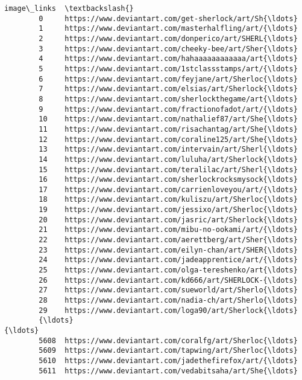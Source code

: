 \documentclass[11pt]{article}
\begin{document}
\begin{Verbatim}[commandchars=\\\{\}]
                                                    image\_links  \textbackslash{}
        0     https://www.deviantart.com/get-sherlock/art/Sh{\ldots}   
        1     https://www.deviantart.com/masterhalfling/art/{\ldots}   
        2     https://www.deviantart.com/donperico/art/SHERL{\ldots}   
        3     https://www.deviantart.com/cheeky-bee/art/Sher{\ldots}   
        4     https://www.deviantart.com/hahaaaaaaaaaaaa/art{\ldots}   
        5     https://www.deviantart.com/1stclassstamps/art/{\ldots}   
        6     https://www.deviantart.com/feyjane/art/Sherloc{\ldots}   
        7     https://www.deviantart.com/elsias/art/Sherlock{\ldots}   
        8     https://www.deviantart.com/sherlockthegame/art{\ldots}   
        9     https://www.deviantart.com/fractionofadot/art/{\ldots}   
        10    https://www.deviantart.com/nathalief87/art/She{\ldots}   
        11    https://www.deviantart.com/risachantag/art/She{\ldots}   
        12    https://www.deviantart.com/coraline125/art/She{\ldots}   
        13    https://www.deviantart.com/intervain/art/Sherl{\ldots}   
        14    https://www.deviantart.com/luluha/art/Sherlock{\ldots}   
        15    https://www.deviantart.com/teralilac/art/Sherl{\ldots}   
        16    https://www.deviantart.com/sherlockrocksmysock{\ldots}   
        17    https://www.deviantart.com/carrienloveyou/art/{\ldots}   
        18    https://www.deviantart.com/kuliszu/art/Sherloc{\ldots}   
        19    https://www.deviantart.com/jessixo/art/Sherloc{\ldots}   
        20    https://www.deviantart.com/jasric/art/Sherlock{\ldots}   
        21    https://www.deviantart.com/mibu-no-ookami/art/{\ldots}   
        22    https://www.deviantart.com/aerettberg/art/Sher{\ldots}   
        23    https://www.deviantart.com/eilyn-chan/art/SHER{\ldots}   
        24    https://www.deviantart.com/jadeapprentice/art/{\ldots}   
        25    https://www.deviantart.com/olga-tereshenko/art{\ldots}   
        26    https://www.deviantart.com/kd666/art/SHERLOCK-{\ldots}   
        27    https://www.deviantart.com/sueworld/art/Sherlo{\ldots}   
        28    https://www.deviantart.com/nadia-ch/art/Sherlo{\ldots}   
        29    https://www.deviantart.com/loga90/art/Sherlock{\ldots}   
        {\ldots}                                                 {\ldots}   
        5608  https://www.deviantart.com/coralfg/art/Sherloc{\ldots}   
        5609  https://www.deviantart.com/tapwing/art/Sherloc{\ldots}   
        5610  https://www.deviantart.com/jadethefirefox/art/{\ldots}   
        5611  https://www.deviantart.com/vedabitsaha/art/She{\ldots}   

\end{Verbatim}
\end{document}
